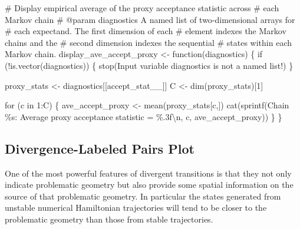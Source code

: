 \documentclass[
  letterpaper,
  DIV=11,
  numbers=noendperiod]{scrartcl}
\newenvironment{Shaded}{\begin{snugshade}}{\end{snugshade}}
\newcommand{\CharTok}[1]{\textcolor[rgb]{0.13,0.47,0.30}{#1}}
\newcommand{\CommentTok}[1]{\textcolor[rgb]{0.37,0.37,0.37}{#1}}
\newcommand{\ControlFlowTok}[1]{\textcolor[rgb]{0.00,0.23,0.31}{#1}}
\newcommand{\DecValTok}[1]{\textcolor[rgb]{0.68,0.00,0.00}{#1}}
\newcommand{\KeywordTok}[1]{\textcolor[rgb]{0.00,0.23,0.31}{#1}}
\newcommand{\NormalTok}[1]{\textcolor[rgb]{0.00,0.23,0.31}{#1}}
\newcommand{\OperatorTok}[1]{\textcolor[rgb]{0.37,0.37,0.37}{#1}}
\newcommand{\SpecialCharTok}[1]{\textcolor[rgb]{0.37,0.37,0.37}{#1}}
\newcommand{\StringTok}[1]{\textcolor[rgb]{0.13,0.47,0.30}{#1}}
\begin{document}
\begin{Shaded}
\begin{Highlighting}[]
\CommentTok{\# Display empirical average of the proxy acceptance statistic across }
\CommentTok{\# each Markov chain}
\CommentTok{\# @param diagnostics A named list of two{-}dimensional arrays for }
\CommentTok{\#                    each expectand.  The first dimension of each}
\CommentTok{\#                    element indexes the Markov chains and the }
\CommentTok{\#                    second dimension indexes the sequential }
\CommentTok{\#                    states within each Markov chain.}
\NormalTok{display\_ave\_accept\_proxy }\OperatorTok{\textless{}{-}}\NormalTok{ function(diagnostics) \{}
  \ControlFlowTok{if}\NormalTok{ (}\OperatorTok{!}\KeywordTok{is}\NormalTok{.vector(diagnostics)) \{}
\NormalTok{    stop(}\StringTok{\textquotesingle{}Input variable \textasciigrave{}diagnostics\textasciigrave{} is not a named list!\textquotesingle{}}\NormalTok{)}
\NormalTok{  \}}
  
\NormalTok{  proxy\_stats }\OperatorTok{\textless{}{-}}\NormalTok{ diagnostics[[}\StringTok{\textquotesingle{}accept\_stat\_\_\textquotesingle{}}\NormalTok{]]}
\NormalTok{  C }\OperatorTok{\textless{}{-}}\NormalTok{ dim(proxy\_stats)[}\DecValTok{1}\NormalTok{]}

  \ControlFlowTok{for}\NormalTok{ (c }\KeywordTok{in} \DecValTok{1}\NormalTok{:C) \{}
\NormalTok{    ave\_accept\_proxy }\OperatorTok{\textless{}{-}}\NormalTok{ mean(proxy\_stats[c,])}
\NormalTok{    cat(sprintf(}\StringTok{\textquotesingle{}Chain }\SpecialCharTok{\%s}\StringTok{: Average proxy acceptance statistic = }\SpecialCharTok{\%.3f}\CharTok{\textbackslash{}n}\StringTok{\textquotesingle{}}\NormalTok{,}
\NormalTok{                c, ave\_accept\_proxy))}
\NormalTok{  \}}
\NormalTok{\}}
\end{Highlighting}
\end{Shaded}

\hypertarget{divergence-labeled-pairs-plot}{%
\subsection{Divergence-Labeled Pairs
Plot}\label{divergence-labeled-pairs-plot}}

One of the most powerful features of divergent transitions is that they
not only indicate problematic geometry but also provide some spatial
information on the source of that problematic geometry. In particular
the states generated from unstable numerical Hamiltonian trajectories
will tend to be closer to the problematic geometry than those from
stable trajectories.
\end{document}
